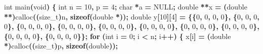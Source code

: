 \documentclass[
  12pt,
]{article}
\newenvironment{Shaded}{\begin{snugshade}}{\end{snugshade}}
\newcommand{\ControlFlowTok}[1]{\textcolor[rgb]{0.13,0.29,0.53}{\textbf{#1}}}
\newcommand{\DataTypeTok}[1]{\textcolor[rgb]{0.13,0.29,0.53}{#1}}
\newcommand{\DecValTok}[1]{\textcolor[rgb]{0.00,0.00,0.81}{#1}}
\newcommand{\KeywordTok}[1]{\textcolor[rgb]{0.13,0.29,0.53}{\textbf{#1}}}
\newcommand{\NormalTok}[1]{#1}
\newcommand{\OperatorTok}[1]{\textcolor[rgb]{0.81,0.36,0.00}{\textbf{#1}}}
\begin{document}
\begin{Shaded}
\begin{Highlighting}[]
\DataTypeTok{int}\NormalTok{ main}\OperatorTok{(}\DataTypeTok{void}\OperatorTok{)} \OperatorTok{\{}
  \DataTypeTok{int}\NormalTok{ n }\OperatorTok{=} \DecValTok{10}\OperatorTok{,}\NormalTok{ p }\OperatorTok{=} \DecValTok{4}\OperatorTok{;}
  \DataTypeTok{char} \OperatorTok{*}\NormalTok{a }\OperatorTok{=}\NormalTok{ NULL}\OperatorTok{;}
  \DataTypeTok{double} \OperatorTok{**}\NormalTok{x }\OperatorTok{=} \OperatorTok{(}\DataTypeTok{double} \OperatorTok{**)}\NormalTok{calloc}\OperatorTok{((}\DataTypeTok{size\_t}\OperatorTok{)}\NormalTok{n}\OperatorTok{,} \KeywordTok{sizeof}\OperatorTok{(}\DataTypeTok{double} \OperatorTok{*));}
  \DataTypeTok{double}\NormalTok{ y}\OperatorTok{[}\DecValTok{10}\OperatorTok{][}\DecValTok{4}\OperatorTok{]} \OperatorTok{=} \OperatorTok{\{\{}\DecValTok{0}\OperatorTok{,} \DecValTok{0}\OperatorTok{,} \DecValTok{0}\OperatorTok{,} \DecValTok{0}\OperatorTok{\},} \OperatorTok{\{}\DecValTok{0}\OperatorTok{,} \DecValTok{0}\OperatorTok{,} \DecValTok{0}\OperatorTok{,} \DecValTok{0}\OperatorTok{\},} \OperatorTok{\{}\DecValTok{0}\OperatorTok{,} \DecValTok{0}\OperatorTok{,} \DecValTok{0}\OperatorTok{,} \DecValTok{0}\OperatorTok{\},} \OperatorTok{\{}\DecValTok{0}\OperatorTok{,} \DecValTok{0}\OperatorTok{,} \DecValTok{0}\OperatorTok{,} \DecValTok{0}\OperatorTok{\},}
                     \OperatorTok{\{}\DecValTok{0}\OperatorTok{,} \DecValTok{0}\OperatorTok{,} \DecValTok{0}\OperatorTok{,} \DecValTok{0}\OperatorTok{\},} \OperatorTok{\{}\DecValTok{0}\OperatorTok{,} \DecValTok{0}\OperatorTok{,} \DecValTok{0}\OperatorTok{,} \DecValTok{0}\OperatorTok{\},} \OperatorTok{\{}\DecValTok{0}\OperatorTok{,} \DecValTok{0}\OperatorTok{,} \DecValTok{0}\OperatorTok{,} \DecValTok{0}\OperatorTok{\},} \OperatorTok{\{}\DecValTok{0}\OperatorTok{,} \DecValTok{0}\OperatorTok{,} \DecValTok{0}\OperatorTok{,} \DecValTok{0}\OperatorTok{\},}
                     \OperatorTok{\{}\DecValTok{0}\OperatorTok{,} \DecValTok{0}\OperatorTok{,} \DecValTok{0}\OperatorTok{,} \DecValTok{0}\OperatorTok{\},} \OperatorTok{\{}\DecValTok{0}\OperatorTok{,} \DecValTok{0}\OperatorTok{,} \DecValTok{0}\OperatorTok{,} \DecValTok{0}\OperatorTok{\}\};}
  \ControlFlowTok{for} \OperatorTok{(}\DataTypeTok{int}\NormalTok{ i }\OperatorTok{=} \DecValTok{0}\OperatorTok{;}\NormalTok{ i }\OperatorTok{\textless{}}\NormalTok{ n}\OperatorTok{;}\NormalTok{ i}\OperatorTok{++)} \OperatorTok{\{}
\NormalTok{    x}\OperatorTok{[}\NormalTok{i}\OperatorTok{]} \OperatorTok{=} \OperatorTok{(}\DataTypeTok{double} \OperatorTok{*)}\NormalTok{calloc}\OperatorTok{((}\DataTypeTok{size\_t}\OperatorTok{)}\NormalTok{p}\OperatorTok{,} \KeywordTok{sizeof}\OperatorTok{(}\DataTypeTok{double}\OperatorTok{));}

\end{Highlighting}
\end{Shaded}
\end{document}
